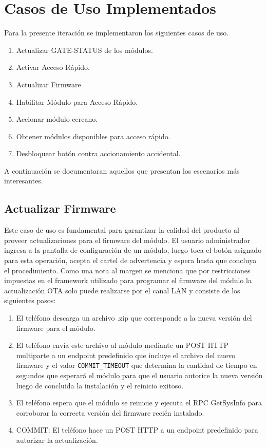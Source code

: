 \section{Casos de Uso Implementados}
Para la presente iteración se implementaron los siguientes casos de uso.
\begin{enumerate}
	\item Actualizar GATE-STATUS de los módulos.
	\item Activar Acceso Rápido.
	\item Actualizar Firmware
	\item Habilitar Módulo para Acceso Rápido.
	\item Accionar módulo cercano.
	\item Obtener módulos disponibles para acceso rápido.
	\item Desbloquear botón contra accionamiento accidental.
\end{enumerate}

A continuación se documentaran aquellos que presentan los escenarios más interesantes.

\subsection{Actualizar Firmware}
Este caso de uso es fundamental para garantizar la calidad del producto al proveer actualizaciones para el firmware del módulo.
El usuario administrador ingresa a la pantalla de configuración de un módulo, luego toca el botón asignado para esta operación, acepta el cartel de advertencia y espera hasta que concluya el procedimiento.
Como una nota al margen se menciona que por restricciones impuestas en el framework utilizado para programar el firmware del módulo la actualización OTA solo puede realizarse por el canal LAN y consiste de los siguientes pasos:
\begin{enumerate}
	\item El teléfono descarga un archivo .zip que corresponde a la nueva versión del firmware para el módulo.
	\item El teléfono envía este archivo al módulo mediante un POST HTTP multiparte a un endpoint predefinido que incluye el archivo del nuevo firmware y el valor \texttt{COMMIT\_TIMEOUT} que determina la cantidad de tiempo en segundos que esperará el módulo para que el usuario autorice la nueva versión luego de concluida la instalación y el reinicio exitoso.
	\item El teléfono espera que el módulo se reinicie y ejecuta el RPC GetSysInfo para corroborar la correcta versión del firmware recién instalado.
	\item COMMIT: El teléfono hace un POST HTTP a un endpoint predefinido para autorizar la actualización.
\end{enumerate} 

